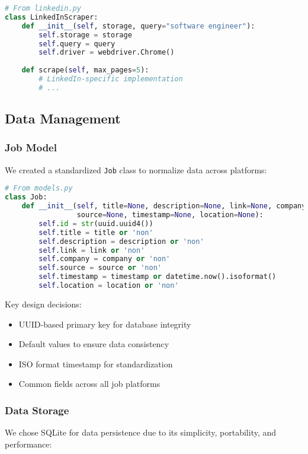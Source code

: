 \documentclass[12pt,a4paper]{article}
\begin{document}
\begin{lstlisting}[language=Python, caption=LinkedIn Scraper (Excerpt)]
# From linkedin.py
class LinkedInScraper:
    def __init__(self, storage, query="software engineer"):
        self.storage = storage
        self.query = query
        self.driver = webdriver.Chrome()
        
    def scrape(self, max_pages=5):
        # LinkedIn-specific implementation
        # ...
\end{lstlisting}

\subsection{Data Management}

\subsubsection{Job Model}
We created a standardized \texttt{Job} class to normalize data across platforms:

\begin{lstlisting}[language=Python, caption=Job Data Model]
# From models.py
class Job:
    def __init__(self, title=None, description=None, link=None, company=None, 
                 source=None, timestamp=None, location=None):
        self.id = str(uuid.uuid4())
        self.title = title or 'non'
        self.description = description or 'non'
        self.link = link or 'non'
        self.company = company or 'non'
        self.source = source or 'non'
        self.timestamp = timestamp or datetime.now().isoformat()
        self.location = location or 'non'
\end{lstlisting}

Key design decisions:
\begin{itemize}
    \item UUID-based primary key for database integrity
    \item Default values to ensure data consistency
    \item ISO format timestamp for standardization
    \item Common fields across all job platforms
\end{itemize}

\subsubsection{Data Storage}
We chose SQLite for data persistence due to its simplicity, portability, and performance:
\end{document}
